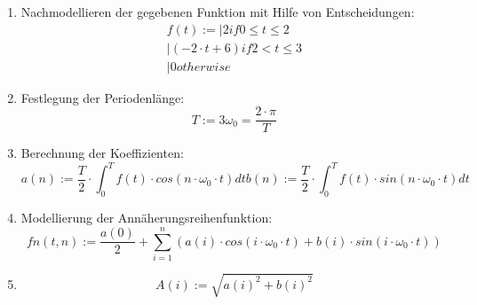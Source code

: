 \documentclass[a4paper,10pt]{article}
\begin{document}
\begin{enumerate}
\item { Nachmodellieren der gegebenen Funktion mit Hilfe von
    Entscheidungen:
    \begin{equation}
      \label{eq:5}
      \begin{split}
        f(t) := \rvert{2 if 0 \le t \le 2}\\
        \rvert{(-2 \cdot t + 6) if 2 < t \le 3}\\
        \rvert{0 otherwise}
      \end{split}
    \end{equation}
  }
\item { Festlegung der Periodenlänge:
    \begin{equation}
      \label{eq:6}
      T := 3
      \omega_0 = \frac{2 \cdot \pi}{T}
    \end{equation}
  }
\item { Berechnung der Koeffizienten:
    \begin{equation}
      \label{eq:7}
          a(n) := \frac{T}{2} \cdot \int_{0}^{T} f(t) \cdot cos(n \cdot \omega_0 \cdot t) dt
          b(n) := \frac{T}{2} \cdot \int_{0}^{T} f(t) \cdot sin(n \cdot \omega_0 \cdot t) dt
    \end{equation}
  }
\item { Modellierung der Annäherungsreihenfunktion:
    \begin{equation}
      \label{eq:8}
      fn(t,n) := \frac{a(0)}{2} + \sum_{i = 1}^{n} (a(i) \cdot cos(i \cdot \omega_0 \cdot t) + b(i) \cdot sin(i \cdot \omega_0 \cdot t))
    \end{equation}
  }
\item {
    \begin{equation}
      \label{eq:9}
      A(i) := \sqrt{a(i)^2 + b(i)^2}
    \end{equation}
  }
\end{enumerate}
\end{document}
